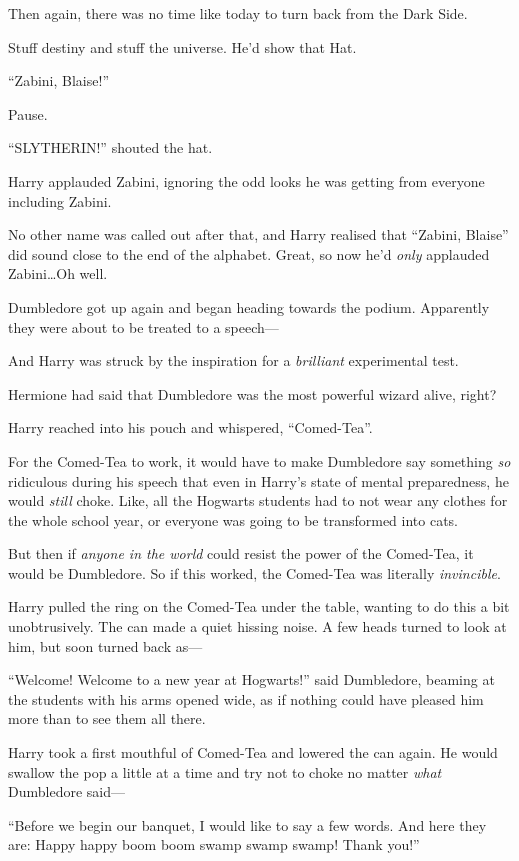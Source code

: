 Then again, there was no time like today to turn back from the Dark Side.

Stuff destiny and stuff the universe. He’d show that Hat.

“Zabini, Blaise!”

Pause.

“SLYTHERIN!” shouted the hat.

Harry applauded Zabini, ignoring the odd looks he was getting from everyone including Zabini.

No other name was called out after that, and Harry realised that “Zabini, Blaise” did sound close to the end of the alphabet. Great, so now he’d \emph{only} applauded Zabini…Oh well.

Dumbledore got up again and began heading towards the podium. Apparently they were about to be treated to a speech—

And Harry was struck by the inspiration for a \emph{brilliant} experimental test.

Hermione had said that Dumbledore was the most powerful wizard alive, right?

Harry reached into his pouch and whispered, “Comed-Tea”.

For the Comed-Tea to work, it would have to make Dumbledore say something \emph{so} ridiculous during his speech that even in Harry’s state of mental preparedness, he would \emph{still} choke. Like, all the Hogwarts students had to not wear any clothes for the whole school year, or everyone was going to be transformed into cats.

But then if \emph{anyone in the world} could resist the power of the Comed-Tea, it would be Dumbledore. So if this worked, the Comed-Tea was literally \emph{invincible}.

Harry pulled the ring on the Comed-Tea under the table, wanting to do this a bit unobtrusively. The can made a quiet hissing noise. A few heads turned to look at him, but soon turned back as—

“Welcome! Welcome to a new year at Hogwarts!” said Dumbledore, beaming at the students with his arms opened wide, as if nothing could have pleased him more than to see them all there.

Harry took a first mouthful of Comed-Tea and lowered the can again. He would swallow the pop a little at a time and try not to choke no matter \emph{what} Dumbledore said—

“Before we begin our banquet, I would like to say a few words. And here they are: Happy happy boom boom swamp swamp swamp! Thank you!”

